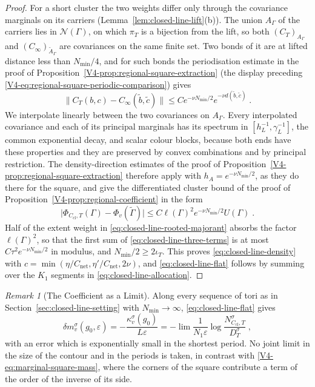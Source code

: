 \documentclass[11pt]{article}
\numberwithin{equation}{section}
\theoremstyle{remark}
\newtheorem{remark}[theorem]{Remark}
\theoremstyle{plain}
\begin{document}
\begin{proof}
For a short cluster the two weights differ only through the covariance marginals on its carriers (Lemma~\ref{lem:closed-line-lift}(b)). The union $A_{\Gamma}$ of the carriers lies in $\mathscr N(\Gamma)$, on which $\pi_T$ is a bijection from the lift, so both $(C_T)_{A_{\Gamma}}$ and $(C_{\infty})_{\widetilde A_{\Gamma}}$ are covariances on the same finite set. Two bonds of it are at lifted distance less than $N_{\min}/4$, and for such bonds the periodisation estimate in the proof of Proposition~\ref{V4-prop:regional-square-extraction} (the display preceding \eqref{V4-eq:regional-square-periodic-comparison}) gives
\begin{equation}\label{eq:closed-line-covariance}
    \bigl\| C_T(b,c)-C_{\infty}(\tilde b,\tilde c)\bigr\|\leqslant Ce^{-\nu N_{\min}/2}e^{-\nu d(\tilde b,\tilde c)}\;.
\end{equation}
We interpolate linearly between the two covariances on $A_{\Gamma}$. Every interpolated covariance and each of its principal marginals has its spectrum in $[h_L^{-1},\gamma_L^{-1}]$, the common exponential decay, and scalar colour blocks, because both ends have these properties and they are preserved by convex combinations and by principal restriction. The density-direction estimates of the proof of Proposition~\ref{V4-prop:regional-square-extraction} therefore apply with $h_A= e^{-\nu N_{\min}/2}$, as they do there for the square, and give the differentiated cluster bound of the proof of Proposition~\ref{V4-prop:regional-coefficient} in the form
\begin{equation}\label{eq:closed-line-short-difference}
    \bigl|\Phi_{C_{\mathrm{cl}},T}(\Gamma)-\Phi_v(\widetilde\Gamma)\bigr|\leqslant C\ell(\Gamma)^2e^{-\nu N_{\min}/2}U(\Gamma)\;.
\end{equation}
Half of the extent weight in \eqref{eq:closed-line-rooted-majorant} absorbs the factor $\ell(\Gamma)^2$, so that the first sum of \eqref{eq:closed-line-three-terms} is at most $C\tau^2e^{-\nu N_{\min}/2}$ in modulus, and $N_{\min}/2\geqslant 2\iota_T$. This proves \eqref{eq:closed-line-density} with $c=\min(\eta/C_{\mathrm{net}},\eta'/C_{\mathrm{net}},2\nu)$, and \eqref{eq:closed-line-flat} follows by summing over the $K_1$ segments in \eqref{eq:closed-line-allocation}.
\end{proof}

\begin{remark}[The Coefficient as a Limit]\label{rem:closed-line-limit}
Along every sequence of tori as in Section~\ref{sec:closed-line-setting} with $N_{\min}\to\infty$, \eqref{eq:closed-line-flat} gives
\begin{equation}\label{eq:closed-line-limit}
    \delta m^{\sigma}_v(g_0,\varepsilon)=-\frac{\kappa^{\sigma}_v(g_0)}{L\varepsilon}
        =-\lim\frac{1}{N_1\varepsilon}\log\frac{N^{\sigma}_{C_{\mathrm{cl}},T}}{D^{\sigma}_T}\;,
\end{equation}
with an error which is exponentially small in the shortest period. No joint limit in the size of the contour and in the periods is taken, in contrast with \eqref{V4-eq:marginal-square-mass}, where the corners of the square contribute a term of the order of the inverse of its side.
\end{remark}
\end{document}
